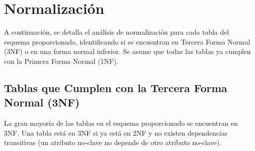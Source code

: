 \section{Normalización}

A continuación, se detalla el análisis de normalización para cada tabla del esquema proporcionado, identificando si se encuentran en Tercera Forma Normal (3NF) o en una forma normal inferior. Se asume que todas las tablas ya cumplen con la Primera Forma Normal (1NF).


\subsection{Tablas que Cumplen con la Tercera Forma Normal (3NF)}

La gran mayoría de las tablas en el esquema proporcionado se encuentran en 3NF. Una tabla está en 3NF si ya está en 2NF y no existen dependencias transitivas (un atributo no-clave no depende de otro atributo no-clave).

